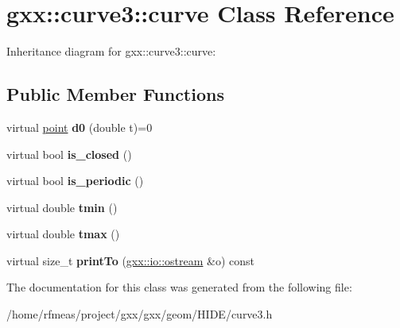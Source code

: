 \hypertarget{classgxx_1_1curve3_1_1curve}{}\section{gxx\+:\+:curve3\+:\+:curve Class Reference}
\label{classgxx_1_1curve3_1_1curve}


Inheritance diagram for gxx\+:\+:curve3\+:\+:curve\+:
\subsection*{Public Member Functions}
\begin{DoxyCompactItemize}
\item 
virtual \hyperlink{classgxx_1_1geom3_1_1point}{point} {\bfseries d0} (double t)=0\hypertarget{classgxx_1_1curve3_1_1curve_a84f0f6d4aeebe521e8e26e47459594d5}{}\label{classgxx_1_1curve3_1_1curve_a84f0f6d4aeebe521e8e26e47459594d5}

\item 
virtual bool {\bfseries is\+\_\+closed} ()\hypertarget{classgxx_1_1curve3_1_1curve_a379db289818f96a48aa84273fa32718f}{}\label{classgxx_1_1curve3_1_1curve_a379db289818f96a48aa84273fa32718f}

\item 
virtual bool {\bfseries is\+\_\+periodic} ()\hypertarget{classgxx_1_1curve3_1_1curve_ac19c573b85e6bff4b858071649c2fb14}{}\label{classgxx_1_1curve3_1_1curve_ac19c573b85e6bff4b858071649c2fb14}

\item 
virtual double {\bfseries tmin} ()\hypertarget{classgxx_1_1curve3_1_1curve_a46210bc3f70e1687fce994b84ab809be}{}\label{classgxx_1_1curve3_1_1curve_a46210bc3f70e1687fce994b84ab809be}

\item 
virtual double {\bfseries tmax} ()\hypertarget{classgxx_1_1curve3_1_1curve_a20e52a188719bd1c5eaac3a3c8d85283}{}\label{classgxx_1_1curve3_1_1curve_a20e52a188719bd1c5eaac3a3c8d85283}

\item 
virtual size\+\_\+t {\bfseries print\+To} (\hyperlink{classgxx_1_1io_1_1ostream}{gxx\+::io\+::ostream} \&o) const \hypertarget{classgxx_1_1curve3_1_1curve_aaedeec15809c75fb9973e49fab3fb3c0}{}\label{classgxx_1_1curve3_1_1curve_aaedeec15809c75fb9973e49fab3fb3c0}

\end{DoxyCompactItemize}


The documentation for this class was generated from the following file\+:\begin{DoxyCompactItemize}
\item 
/home/rfmeas/project/gxx/gxx/geom/\+H\+I\+D\+E/curve3.\+h\end{DoxyCompactItemize}
